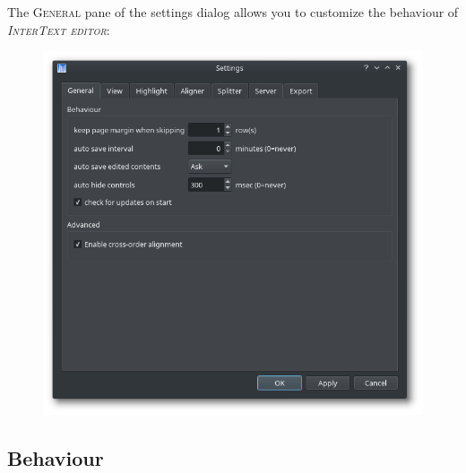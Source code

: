 \documentclass[a4paper,10pt,oneside]{book}
\newcommand{\ITeditor}{\textit{\textsc{InterText editor}}\xspace}
\newcommand{\menu}[1]{\textsc{#1}}
\begin{document}
The \menu{General} pane of the settings dialog allows you to customize the behaviour of \ITeditor:

\begin{figure}[htb]
 \includegraphics[width=\textwidth]{screenshots/settings_general.png}
\end{figure}

\subsection*{Behaviour}
\end{document}
